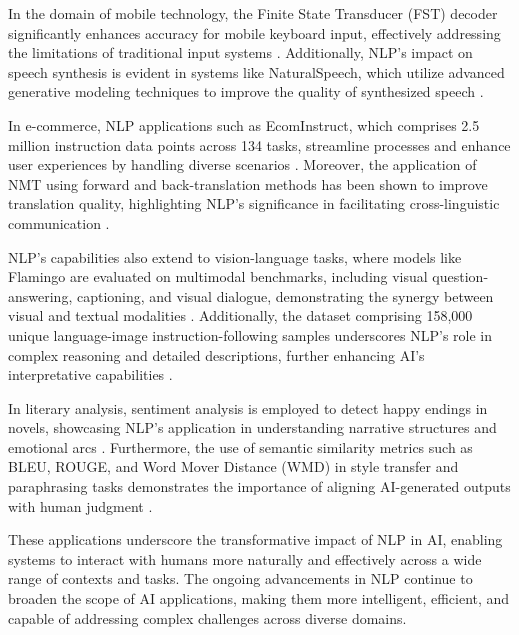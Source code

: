 In the domain of mobile technology, the Finite State Transducer (FST) decoder significantly enhances accuracy for mobile keyboard input, effectively addressing the limitations of traditional input systems \cite{ouyang2017mobilekeyboardinputdecoding}. Additionally, NLP's impact on speech synthesis is evident in systems like NaturalSpeech, which utilize advanced generative modeling techniques to improve the quality of synthesized speech \cite{tan2022naturalspeechendtoendtextspeech}.

In e-commerce, NLP applications such as EcomInstruct, which comprises 2.5 million instruction data points across 134 tasks, streamline processes and enhance user experiences by handling diverse scenarios \cite{li2023ecomgptinstructiontuninglargelanguage}. Moreover, the application of NMT using forward and back-translation methods has been shown to improve translation quality, highlighting NLP's significance in facilitating cross-linguistic communication \cite{bogoychev2020domaintranslationesenoisesynthetic}.

NLP's capabilities also extend to vision-language tasks, where models like Flamingo are evaluated on multimodal benchmarks, including visual question-answering, captioning, and visual dialogue, demonstrating the synergy between visual and textual modalities \cite{alayrac2022flamingo}. Additionally, the dataset comprising 158,000 unique language-image instruction-following samples underscores NLP's role in complex reasoning and detailed descriptions, further enhancing AI's interpretative capabilities \cite{liu2024visual}.

In literary analysis, sentiment analysis is employed to detect happy endings in novels, showcasing NLP's application in understanding narrative structures and emotional arcs \cite{jannidis2016analyzingfeaturesdetectionhappy}. Furthermore, the use of semantic similarity metrics such as BLEU, ROUGE, and Word Mover Distance (WMD) in style transfer and paraphrasing tasks demonstrates the importance of aligning AI-generated outputs with human judgment \cite{yamshchikov2020styletransferparaphraselookingsensible}.

These applications underscore the transformative impact of NLP in AI, enabling systems to interact with humans more naturally and effectively across a wide range of contexts and tasks. The ongoing advancements in NLP continue to broaden the scope of AI applications, making them more intelligent, efficient, and capable of addressing complex challenges across diverse domains.

